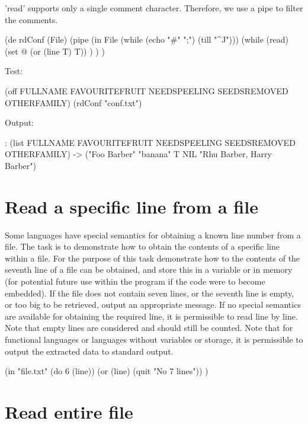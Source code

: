 \begin{wideverbatim}

'read' supports only a single comment character. Therefore, we use a pipe to
filter the comments.

(de rdConf (File)
   (pipe (in File (while (echo "#" ";") (till "^J")))
      (while (read)
         (set @ (or (line T) T)) ) ) )

Test:

(off FULLNAME FAVOURITEFRUIT NEEDSPEELING SEEDSREMOVED OTHERFAMILY)
(rdConf "conf.txt")

Output:

: (list FULLNAME FAVOURITEFRUIT NEEDSPEELING SEEDSREMOVED OTHERFAMILY)
-> ("Foo Barber" "banana" T NIL "Rhu Barber, Harry Barber")

\end{wideverbatim}

\pagebreak{}
\section*{Read a specific line from a file}

Some languages have special semantics for obtaining a known line number
from a file. The task is to demonstrate how to obtain the contents of a
specific line within a file. For the purpose of this task demonstrate
how to the contents of the seventh line of a file can be obtained, and
store this in a variable or in memory (for potential future use within
the program if the code were to become embedded). If the file does not
contain seven lines, or the seventh line is empty, or too big to be
retrieved, output an appropriate message. If no special semantics are
available for obtaining the required line, it is permissible to read
line by line. Note that empty lines are considered and should still be
counted. Note that for functional languages or languages without
variables or storage, it is permissible to output the extracted data to
standard output.

\begin{wideverbatim}

(in "file.txt"
   (do 6 (line))
   (or (line) (quit "No 7 lines")) )

\end{wideverbatim}

\pagebreak{}
\section*{Read entire file}

